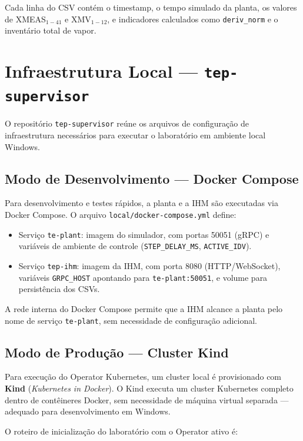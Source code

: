 Cada linha do CSV contém o timestamp, o tempo simulado da planta, os valores de XMEAS$_{1-41}$ e XMV$_{1-12}$, e indicadores calculados como \texttt{deriv\_norm} e o inventário total de vapor.

\section{Infraestrutura Local — \texttt{tep-supervisor}}
\label{sec:supervisor}

O repositório \texttt{tep-supervisor} reúne os arquivos de configuração de infraestrutura necessários para executar o laboratório em ambiente local Windows.

\subsection{Modo de Desenvolvimento — Docker Compose}

Para desenvolvimento e testes rápidos, a planta e a IHM são executadas via Docker Compose. O arquivo \texttt{local/docker-compose.yml} define:

\begin{itemize}
  \item Serviço \texttt{te-plant}: imagem do simulador, com portas 50051 (gRPC) e variáveis de ambiente de controle (\texttt{STEP\_DELAY\_MS}, \texttt{ACTIVE\_IDV}).
  \item Serviço \texttt{tep-ihm}: imagem da IHM, com porta 8080 (HTTP/WebSocket), variáveis \texttt{GRPC\_HOST} apontando para \texttt{te-plant:50051}, e volume para persistência dos CSVs.
\end{itemize}

A rede interna do Docker Compose permite que a IHM alcance a planta pelo nome de serviço \texttt{te-plant}, sem necessidade de configuração adicional.

\subsection{Modo de Produção — Cluster Kind}

Para execução do Operator Kubernetes, um cluster local é provisionado com \textbf{Kind} (\textit{Kubernetes in Docker}). O Kind executa um cluster Kubernetes completo dentro de contêineres Docker, sem necessidade de máquina virtual separada — adequado para desenvolvimento em Windows.

O roteiro de inicialização do laboratório com o Operator ativo é:

